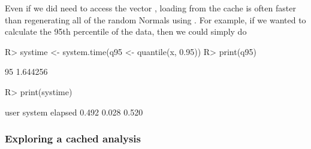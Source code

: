 \documentclass[nojss]{jss}
\begin{document}
Even if we did need to access the vector , loading from the
cache is often faster than regenerating all of the random Normals
using .  For example, if we wanted to calculate the 95th
percentile of the data, then we could simply do
\begin{Schunk}
\begin{Sinput}
R> systime <- system.time(q95 <- quantile(x, 0.95))
R> print(q95)
\end{Sinput}
\begin{Soutput}
     95%
1.644256 
\end{Soutput}
\begin{Sinput}
R> print(systime)
\end{Sinput}
\begin{Soutput}
   user  system elapsed 
  0.492   0.028   0.520 
\end{Soutput}
\end{Schunk}



\subsubsection{Exploring a cached analysis}
\end{document}
